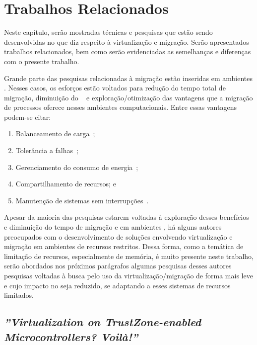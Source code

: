 \glsresetall
\chapter{Trabalhos Relacionados}
\label{chap.related-work}

Neste capítulo, serão mostradas técnicas e pesquisas que estão sendo desenvolvidas no que diz respeito à virtualização e migração. Serão apresentados trabalhos relacionados, bem como serão evidenciadas as semelhanças e diferenças com o presente trabalho.

Grande parte das pesquisas relacionadas à migração estão inseridas em ambientes \cloud. Nesses casos, os esforços estão voltados para redução do tempo total de migração, diminuição do \downtime~\cite{migration-linux-conteiners,clark2005live} e exploração/otimização das vantagens que a migração de processos oferece nesses ambientes computacionais. Entre essas vantagens podem-se citar:
\begin{enumerate}[label=(\roman*)]
    \item Balanceamento de carga~\cite{live-vm-migration-techniques,ada-things};
    \item Tolerância a falhas~\cite{fernando2019live};
    \item Gerenciamento do consumo de energia~\cite{aldossary2018performance};
    \item Compartilhamento de recursos; e
    \item Manutenção de sistemas sem interrupções~\cite{live-vm-migration-techniques,ada-things}.
\end{enumerate}

Apesar da maioria das pesquisas estarem voltadas à exploração desses benefícios e diminuição do tempo de migração e \downtime em ambientes \cloud, há alguns autores preocupados com o desenvolvimento de soluções envolvendo virtualização e migração em ambientes de recursos restritos. Dessa forma, como a temática de limitação de recursos, especialmente de memória, é muito presente neste trabalho, serão abordados nos próximos parágrafos algumas pesquisas desses autores \ie pesquisas voltadas à busca pelo uso da virtualização/migração de forma mais leve e cujo impacto no \hardware seja reduzido, se adaptando a esses sistemas de recursos limitados.

\section{\textit{''Virtualization on TrustZone-enabled Microcontrollers? Voilà!''}}


